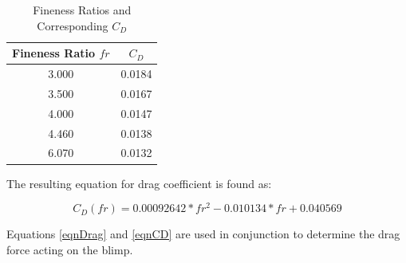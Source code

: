 \documentclass[../main.tex]{subfiles}
\begin{document}
\begin{table}[H]
	\caption{Fineness Ratios and Corresponding $C_D$}
	\label{tbl:finenessCoefficient}
\begin{center}
	\begin{tabular}{|c|c|}
	\hline 
	\textbf{Fineness Ratio $fr$} & \textbf{$C_D$} \\ 
	\hline 
	3.000 & 0.0184 \\ 
	\hline 
	3.500 & 0.0167 \\ 
	\hline 
	4.000 & 0.0147 \\ 
	\hline
	4.460 & 0.0138 \\ 
	\hline 
	6.070 & 0.0132 \\ 
	\hline  
\end{tabular} 
\end{center}
\end{table}

The resulting equation for drag coefficient is found as:

\begin{equation} \label{eqnCD}
	C_D(fr)= 0.00092642*fr^2 -0.010134*fr + 0.040569
\end{equation}

Equations \ref{eqnDrag} and \ref{eqnCD} are used in conjunction to determine the drag force acting on the blimp.
\end{document}
